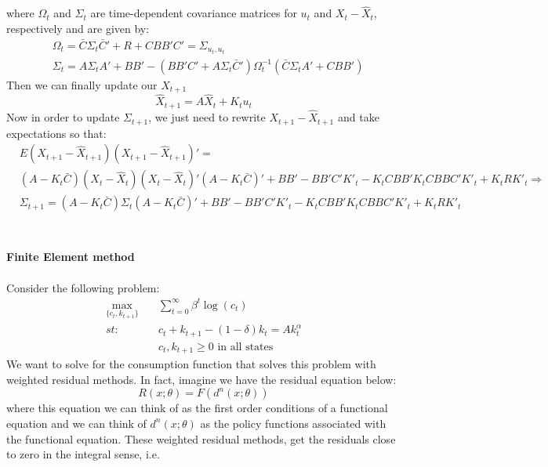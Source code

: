 \documentclass{article} %
\begin{document}
where $\Omega_t$ and $\Sigma_t$ are time-dependent covariance matrices
for $u_t$ and $X_t - \hat{X}_t$, respectively and are given by:
\begin{align*}
 & \Omega_t = \bar{C} \Sigma_t \bar{C}' + R + C B B' C' = \Sigma_{u_t,u_t} \\
 & \Sigma_t = A \Sigma_t A' + B B' - (B B' C' + A \Sigma_t \bar{C}') \Omega_t^{-1} (\bar{C} \Sigma_t A' + C B B')
\end{align*}
Then we can finally update our $X_{t+1}$
\begin{equation}
  \hat{X}_{t+1} = A \hat{X}_t + K_t u_t
\end{equation}
Now in order to update $\Sigma_{t+1}$, we just need to rewrite
$X_{t+1} - \hat{X}_{t+1}$ and take expectations so that:
\begin{align*}
  &E\left(X_{t+1} - \hat{X}_{t+1} \right)\left(X_{t+1} - \hat{X}_{t+1}\right)'= \\
  & (A - K_t \bar{C})(X_t - \hat{X}_t)(X_t - \hat{X}_t)'(A - K_t \bar{C})' + B B' - B B' C' K'_t - K_t C B B' K_t C B B C' K'_t + K_t R K'_t \Rightarrow\\
  &\Sigma_{t+1} = (A - K_t \bar{C})\Sigma_t(A - K_t \bar{C})' + B B' - B B' C' K'_t - K_t C B B' K_t C B B C' K'_t + K_t R K'_t \\
  \end{align*}
\\
\\
\textbf{Finite Element method}
\\
\\
Consider the following problem:
\begin{align*}
  \max_{\{c_t, k_{t+1}\}} & \quad  \sum_{t=0}^{\infty} \beta^t \log(c_t)    \\
  st:     & \quad c_t +  k_{t+1} - (1-\delta)k_t = Ak_t^{\alpha}  \\
          & \quad c_t , k_{t+1} \geq 0 \text{ in all states}
\end{align*}
We want to solve for the consumption function that solves this problem with weighted residual methods. In fact, imagine we have the residual equation below:
\begin{equation*}
  R(x;\theta) = F(d^n(x;\theta))
\end{equation*}
where this equation we can think of as the first order conditions of a functional equation and we can think of $d^n(x;\theta)$ as the policy functions associated with the functional equation. These weighted residual methods, get the residuals close to zero in the integral sense, i.e.
\end{document}

